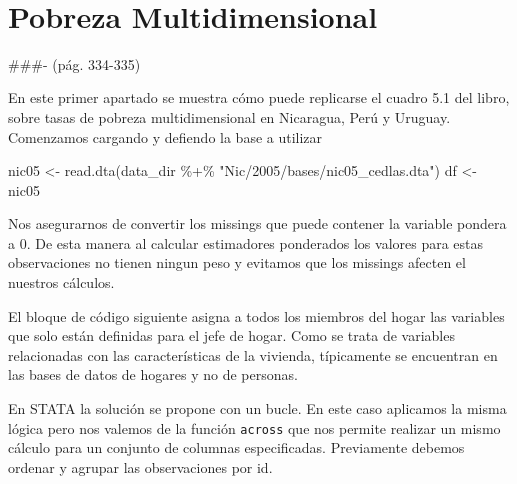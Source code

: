 \documentclass[
]{book}
\newenvironment{Shaded}{\begin{snugshade}}{\end{snugshade}}
\newcommand{\DecValTok}[1]{\textcolor[rgb]{0.00,0.00,0.81}{#1}}
\newcommand{\FunctionTok}[1]{\textcolor[rgb]{0.00,0.00,0.00}{#1}}
\newcommand{\NormalTok}[1]{#1}
\newcommand{\OtherTok}[1]{\textcolor[rgb]{0.56,0.35,0.01}{#1}}
\newcommand{\SpecialCharTok}[1]{\textcolor[rgb]{0.00,0.00,0.00}{#1}}
\newcommand{\StringTok}[1]{\textcolor[rgb]{0.31,0.60,0.02}{#1}}
\begin{document}
~

\hypertarget{pobreza-multidimensional}{%
\section{Pobreza Multidimensional}\label{pobreza-multidimensional}}

\#\#\#- (pág. 334-335)

En este primer apartado se muestra cómo puede replicarse el cuadro 5.1 del libro, sobre tasas de pobreza multidimensional en Nicaragua, Perú y Uruguay. Comenzamos cargando y defiendo la base a utilizar

\begin{Shaded}
\begin{Highlighting}[]
\NormalTok{nic05 }\OtherTok{\textless{}{-}} \FunctionTok{read.dta}\NormalTok{(data\_dir }\SpecialCharTok{\%+\%} \StringTok{"Nic/2005/bases/nic05\_cedlas.dta"}\NormalTok{)      }
\NormalTok{df }\OtherTok{\textless{}{-}}\NormalTok{ nic05}
\end{Highlighting}
\end{Shaded}

Nos asegurarnos de convertir los missings que puede contener la variable pondera a 0. De esta manera al calcular estimadores ponderados los valores para estas observaciones no tienen ningun peso y evitamos que los missings afecten el nuestros cálculos.

\begin{Shaded}
\end{Shaded}

El bloque de código siguiente asigna a todos los miembros del hogar las variables que solo están definidas para el jefe de hogar. Como se trata de variables relacionadas con las características de la vivienda, típicamente se encuentran
en las bases de datos de hogares y no de personas.

En STATA la solución se propone con un bucle. En este caso aplicamos la misma lógica pero nos valemos de la función \texttt{across} que nos permite realizar un mismo cálculo para un conjunto de columnas especificadas. Previamente debemos ordenar y agrupar las observaciones por id.
\end{document}
